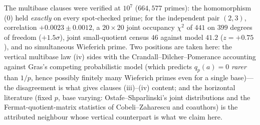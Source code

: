 \documentclass[11pt]{article}
\theoremstyle{definition}
\begin{document}
The multibase clauses were verified at $10^7$ ($664{,}577$ primes):
the homomorphism (0) held \emph{exactly} on every spot-checked prime;
for the independent pair $(2,3)$, correlation
$+0.0023\pm0.0012$, a $20\times20$ joint occupancy $\chi^2$ of
$441$ on $399$ degrees of freedom ($+1.5\sigma$), joint
small-quotient census $46$ against model $41.2$ ($z=+0.75$), and no
simultaneous Wieferich prime.  Two positions are taken here: the
vertical multibase law (iv) sides with the Crandall--Dilcher--Pomerance
accounting against Gras's competing probabilistic model (which
predicts $q_p(a)=0$ \emph{rarer} than $1/p$, hence possibly finitely
many Wieferich primes even for a single base)---the disagreement is what
gives clauses (iii)--(iv) content; and the horizontal
literature (fixed $p$, base varying: Ostafe--Shparlinski's joint
distributions and the Fermat-quotient-matrix statistics of
Cobeli--Zaharescu and coauthors) is the attributed neighbour whose
vertical counterpart is what we claim here.
\end{document}
